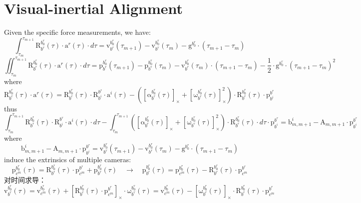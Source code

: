 \documentclass[12pt, onecolumn]{article}
\newcommand\liehat[1]{\left[ #1 \right]_\times}
\newcommand\bsm[1]{\boldsymbol{\mathrm{#1}}}
\newcommand\rotation[2]{{\bsm{R}_{#1}^{#2}}}
\newcommand\angvel[2]{{\bsm{\omega}_{#1}^{#2}}}
\newcommand\angacce[2]{{\bsm{\alpha}_{#1}^{#2}}}
\newcommand\translation[2]{{\bsm{p}_{#1}^{#2}}}
\newcommand\linvel[2]{{\bsm{v}_{#1}^{#2}}}
\newcommand\gravity[1]{{\bsm{g}^{#1}}}
\begin{document}
	\section{Visual-inertial Alignment}
	Given the specific force measurements, we have:
	\begin{equation}
	\int_{\tau_m}^{\tau_{m+1}}\rotation{b^r}{b^r_0}(\tau) \cdot\bsm{a}^r(\tau)\cdot d\tau
	=\linvel{b^r}{b^r_0}(\tau_{m+1})-\linvel{b^r}{b^r_0}(\tau_m)-\gravity{b^r_0}\cdot\left(\tau_{m+1}-\tau_m \right) 
	\end{equation}
	\begin{equation}
		\iint_{\tau_m}^{\tau_{m+1}}\rotation{b^r}{b^r_0}(\tau) \cdot\bsm{a}^r(\tau)\cdot d\tau
		=\translation{b^r}{b^r_0}(\tau_{m+1})-\translation{b^r}{b^r_0}(\tau_m)
		-\linvel{b^r}{b^r_0}(\tau_m)\cdot\left(\tau_{m+1}-\tau_m \right)
		-\frac{1}{2}\cdot\gravity{b^r_0}\cdot\left(\tau_{m+1}-\tau_m \right)^2
		\end{equation}
	where
	\begin{equation}
		\rotation{b^r}{b^r_0}(\tau) \cdot\bsm{a}^r(\tau)
		=\rotation{b^r}{b^r_0}(\tau) \cdot\rotation{b^i}{b^r} \cdot\bsm{a}^i(\tau) -\left(\liehat{\angacce{b^r}{b^r_0}(\tau)}+ \liehat{\angvel{b^r}{b^r_0}(\tau)}^2\right) \cdot\rotation{b^r}{b^r_0}(\tau)\cdot\translation{b^i}{b^r}
	\end{equation}
	thus
	\begin{equation}
	\int_{\tau_m}^{\tau_{m+1}}\rotation{b^r}{b^r_0}(\tau) \cdot\rotation{b^i}{b^r} \cdot\bsm{a}^i(\tau) \cdot d\tau-
	\int_{\tau_m}^{\tau_{m+1}}\left(\liehat{\angacce{b^r}{b^r_0}(\tau)}+ \liehat{\angvel{b^r}{b^r_0}(\tau)}^2\right) \cdot\rotation{b^r}{b^r_0}(\tau)\cdot d\tau\cdot\translation{b^i}{b^r}
	=\bsm{b}^i_{m,m+1}-\bsm{A}_{m,m+1}\cdot\translation{b^i}{b^r}
	\end{equation}
	where
	\begin{equation}
	\bsm{b}^i_{m,m+1}-\bsm{A}_{m,m+1}\cdot\translation{b^i}{b^r}=
	\linvel{b^r}{b^r_0}(\tau_{m+1})-\linvel{b^r}{b^r_0}(\tau_m)-\gravity{b^r_0}\cdot\left(\tau_{m+1}-\tau_m \right) 
	\end{equation}
	induce the extrinsics of multiple cameras:
	\begin{equation}
	\translation{c^m}{b^r_0}(\tau)=
	\rotation{b^r}{b^r_0}(\tau)\cdot\translation{c^m}{b^r}+\translation{b^r}{b^r_0}(\tau)
	\quad\to\quad
	\translation{b^r}{b^r_0}(\tau)=\translation{c^m}{b^r_0}(\tau)-\rotation{b^r}{b^r_0}(\tau)\cdot\translation{c^m}{b^r}
	\end{equation}
	对时间求导：
	\begin{equation}
	\linvel{b^r}{b^r_0}(\tau)=\linvel{c^m}{b^r_0}(\tau)+
	\liehat{\rotation{b^r}{b^r_0}(\tau)\cdot\translation{c^m}{b^r}}\cdot\angvel{b^r}{b^r_0}(\tau)
	=\linvel{c^m}{b^r_0}(\tau)-
		\liehat{\angvel{b^r}{b^r_0}(\tau)}\cdot\rotation{b^r}{b^r_0}(\tau)\cdot\translation{c^m}{b^r}
	\end{equation}
\end{document}
